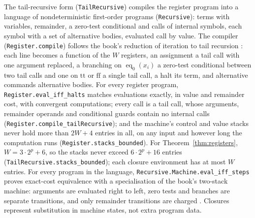 \documentclass[11pt]{article}
\theoremstyle{remark}
\newcommand{\eq}{\operatorname{eq}}
\newcommand{\lean}[1]{\nolinkurl{#1}}
\begin{document}
The tail-recursive form (\lean{TailRecursive}) compiles the register program
into a language of nondeterministic first-order programs (\lean{Recursive}):
terms with variables, remainder, a zero-test conditional and calls of
internal symbols, each symbol with a set of alternative bodies, evaluated
call by value. The compiler (\lean{Register.compile}) follows the book's
reduction of iteration to tail recursion \cite[\S2C]{moschovakis2019}: each
line becomes a function of the $W$ registers, an assignment a tail call with
one argument replaced, a branching on $\eq_0(x_i)$ a zero-test conditional
between two tail calls and one on $\mathrm{tt}$ or $\mathrm{ff}$ a single tail
call, a halt its term, and alternative commands alternative bodies. For
every register program, \lean{Register.eval_iff_halts} matches evaluations
exactly, in value and remainder cost, with convergent computations; every
call is a tail call, whose arguments, remainder operands and conditional
guards contain no internal calls (\lean{Register.compile_tailRecursive});
and the machine's control and value stacks never hold more than $2W+4$
entries in all, on any input and however long the computation runs
(\lean{Register.stacks_bounded}). For Theorem~\ref{thm:registers}, $W=3\cdot2^p+6$,
so the stacks never exceed $6\cdot2^p+16$ entries
(\lean{TailRecursive.stacks_bounded}); each closure environment has at most
$W$ entries. For
every program in the language, \lean{Recursive.Machine.eval_iff_steps}
proves exact-cost equivalence with a specialisation of the book's two-stack
machine: arguments are evaluated right to left, zero tests and branches are
separate transitions, and only remainder transitions are charged
\cite[Table~1, p.~75]{moschovakis2019}. Closures represent
substitution in machine states, not extra program data.
\end{document}
